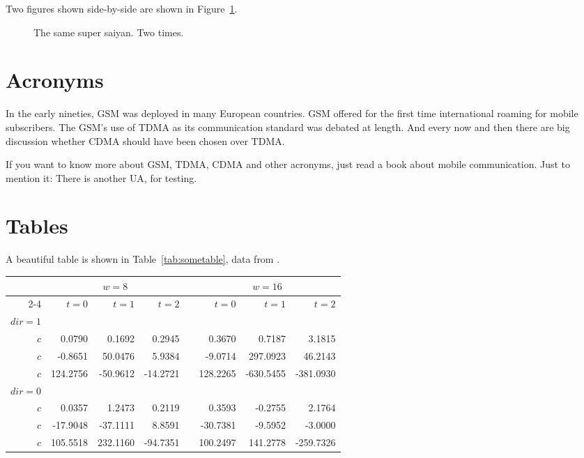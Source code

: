 Two figures shown side-by-side are shown in Figure~\ref{fig:test2}.

\begin{figure}[!ht]
	\centering
	\qquad
	\caption[Short Caption]{The same super saiyan. Two times.}        
	\label{fig:test2}
\end{figure}

\blindtext

\section{Acronyms}

In the early nineties, \acs{GSM} was deployed in many European countries. \ac{GSM} offered for the first time international roaming for mobile subscribers. The \acs{GSM}’s use of \ac{TDMA} as its communication standard was debated at length. And every now and then there are big discussion whether \ac{CDMA} should have been chosen over \ac{TDMA}.

If you want to know more about \acf{GSM}, \acf{TDMA}, \acf{CDMA} and other acronyms, just read a book about mobile communication. Just to mention it: There is another \ac{UA}, for testing.


\section{Tables}

A beautiful table is shown in Table~\ref{tab:sometable}, data from \textcite{Ebejer2012}.

\begin{table*}\centering
	\caption{A Beautiful and Complex Table (for tables captions above)}\label{tab:sometable}	
	\begin{tabular}{@{}rrrrcrrr@{}}\toprule
		& \multicolumn{3}{c}{$w = 8$} & \phantom{abc}& \multicolumn{3}{c}{$w = 16$} \\
		\cmidrule{2-4} \cmidrule{6-8} 
		& $t=0$ & $t=1$ & $t=2$ && $t=0$ & $t=1$ & $t=2$\\ \midrule
		$dir=1$\\
		$c$ & 0.0790 & 0.1692 & 0.2945 && 0.3670 & 0.7187 & 3.1815\\
		$c$ & -0.8651& 50.0476& 5.9384&& -9.0714& 297.0923& 46.2143\\
		$c$ & 124.2756& -50.9612& -14.2721&& 128.2265& -630.5455& -381.0930\\
		$dir=0$\\
		$c$ & 0.0357& 1.2473& 0.2119&& 0.3593& -0.2755& 2.1764\\
		$c$ & -17.9048& -37.1111& 8.8591&& -30.7381& -9.5952& -3.0000\\
		$c$ & 105.5518& 232.1160& -94.7351&& 100.2497& 141.2778& -259.7326\\
		\bottomrule
	\end{tabular}
\end{table*}

